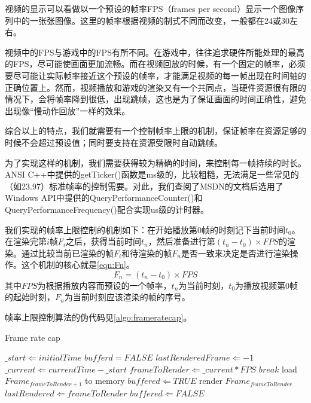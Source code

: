 视频的显示可以看做以一个预设的帧率FPS（frames per second）显示一个图像序列中的一张张图像。这里的帧率根据视频的制式不同而改变，一般都在24或30左右。

视频中的FPS与游戏中的FPS有所不同。在游戏中，往往追求硬件所能处理的最高的FPS，尽可能使画面更加流畅。而在视频回放的时候，有一个固定的帧率，必须要尽可能让实际帧率接近这个预设的帧率，才能满足视频的每一帧出现在时间轴的正确位置上。然而，视频播放和游戏的渲染又有一个共同点，当硬件资源很有限的情况下，会将帧率降到很低，出现跳帧，这也是为了保证画面的时间正确性，避免出现像“慢动作回放”一样的效果。

综合以上的特点，我们就需要有一个控制帧率上限的机制，保证帧率在资源足够的时候不会超过预设值；同时要支持在资源受限时自动跳帧。

为了实现这样的机制，我们需要获得较为精确的时间，来控制每一帧持续的时长。ANSI C++中提供的getTicker()函数是ms级的，比较粗糙，无法满足一些常见的（如23.97）标准帧率的控制需要。对此，我们查阅了MSDN的文档后选用了Windows API中提供的QueryPerformanceCounter()和QueryPerformanceFrequency()配合实现us级的计时器。

我们实现的帧率上限控制的机制如下：在开始播放第0帧的时刻记下当前时间$t_{0}$。在渲染完第$i$帧$F_{i}$之后，获得当前时间$t_{n}$，然后准备进行第$(t_{n}-t_{0})\times FPS$的渲染。通过比较当前已渲染的帧$F_{i}$和待渲染的帧$F_{n}$是否一致来决定是否进行渲染操作。这个机制的核心就是\autoref{eqn:Fn}。
\begin{equation}\label{eqn:Fn}
F_{n}=(t_{n}-t_{0})\times FPS
\end{equation}
其中$FPS$为根据播放内容而预设的一个帧率，$t_{n}$为当前时刻，$t_{0}$为播放视频第0帧的起始时刻，$F_{n}$为当前时刻应该渲染的帧的序号。

帧率上限控制算法的伪代码见\autoref{algo:frameratecap}。

\begin{algorithm}
\caption{Frame rate cap}
\label{algo:frameratecap}
\begin{algorithmic}[1]
	\STATE $\_start \Leftarrow initialTime$ %
	\STATE $bufferd = FALSE$
	\STATE $lastRenderedFrame \Leftarrow -1$
		\STATE $\_current \Leftarrow currentTime - \_start$ %
		\STATE $frameToRender \Leftarrow \_current * FPS$ %
			\STATE $break$ 
		\ENDIF
			\STATE load $Frame_{frameToRender+1}$ to memory
			\STATE $buffered \Leftarrow TRUE$
		\ENDIF
			\STATE render $Frame_{frameToRender}$
			\STATE $lastRendered \Leftarrow frameToRender$
			\STATE $buffered \Leftarrow FALSE$
		\ENDIF
	\ENDWHILE
\end{algorithmic}
\end{algorithm}


